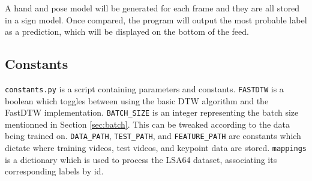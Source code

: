 \documentclass[final,rdr32.tex]{subfiles}
\begin{document}
A hand and pose model will be generated for each frame and they are all stored in a sign model. Once compared, the program will output the most probable label as a prediction, which will be displayed on the bottom of the feed.

\subsection{Constants}
\label{sec:constants}

\verb|constants.py| is a script containing parameters and constants.
\verb|FASTDTW| is a boolean which toggles between using the basic DTW algorithm and the FastDTW implementation.
\verb|BATCH_SIZE| is an integer representing the batch size mentionned in Section \ref{sec:batch}. This can be tweaked according to the data being trained on.
\verb|DATA_PATH|, \verb|TEST_PATH|, and \verb|FEATURE_PATH| are constants which dictate where training videos, test videos, and keypoint data are stored.
\verb|mappings| is a dictionary which is used to process the LSA64 dataset, associating its corresponding labels by id.
\end{document}
